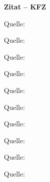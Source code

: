 \textbf{Zitat -- KFZ}

Quelle: ~\textcite{schmidt:2015:klima}

Quelle: ~\textcite{sternbeck:2015:bremsen}

Quelle: ~\textcite{schneehage:2018:aktoren}

Quelle: ~\textcite{frei:2017:hochvolt}

Quelle: ~\textcite{frei:2013:elektrik}

Quelle: ~\textcite{gunther:2019:commonrail}

Quelle: ~\textcite{peter:2015:benzindirekt}

Quelle: ~\textcite{schneehage:2014:sensoren}

Quelle: ~\textcite{frei:2018:vernetztesysteme}

Quelle: ~\textcite{bosch:2020:training}

